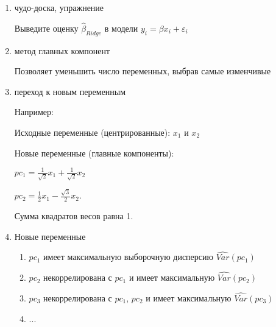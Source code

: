 \documentclass[12pt,a4paper]{article}
\begin{document}
{\begin{enumerate}
\begin{enumerate}
\item Ридж-регрессия

\[
\min_{\hat{\beta}} \sum_{i=1}^n (y_i-\hat{y}_i)^2 + \lambda \sum_{j=1}^k \hat{\beta}_j^2
\]

\item LASSO

\[
\min_{\hat{\beta}} \sum_{i=1}^n (y_i-\hat{y}_i)^2 + \lambda \sum_{j=1}^k |\hat{\beta}_j|
\]

\item Метод эластичной сети

\[
\min_{\hat{\beta}} \sum_{i=1}^n (y_i-\hat{y}_i)^2 + \lambda_1 \sum_{j=1}^k |\hat{\beta}_j| + \lambda_2 \sum_{j=1}^k \hat{\beta}_j^2
\]


\end{enumerate}

\item чудо-доска, упражнение

Выведите оценку $\hat{\beta}_{Ridge}$ в модели $y_i=\beta x_i + \varepsilon_i$

\item метод главных компонент

Позволяет уменьшить число переменных, выбрав самые изменчивые 

\item  переход к новым переменным

Например:

Исходные переменные (центрированные): $x_1$ и $x_2$

Новые переменные (главные компоненты): 

$pc_1=\frac{1}{\sqrt{2}}x_1+\frac{1}{\sqrt{2}}x_2$ 

$pc_2=\frac{1}{2}x_1-\frac{\sqrt{3}}{2}x_2$.

Сумма квадратов весов равна 1.

\item Новые переменные

\begin{enumerate}
\item $pc_1$ имеет максимальную выборочную дисперсию $\widehat{Var}(pc_1)$
\item $pc_2$ некоррелирована с $pc_1$ и имеет максимальную $\widehat{Var}(pc_2)$
\item $pc_3$ некоррелирована с $pc_1$, $pc_2$ и имеет максимальную $\widehat{Var}(pc_3)$
\item ...
\end{enumerate}



\end{enumerate}}
\end{document}
